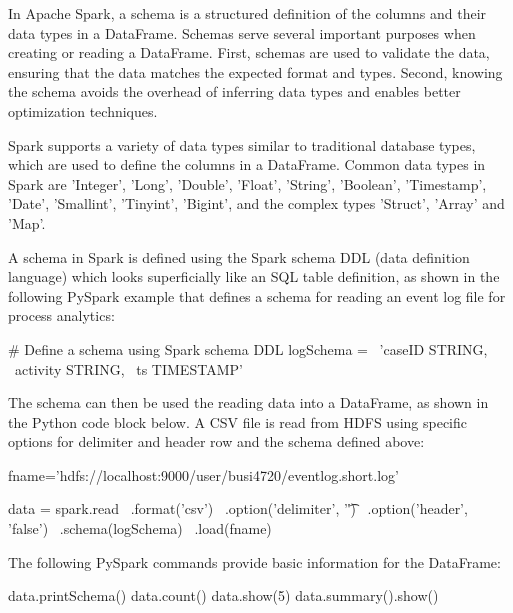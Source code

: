 In Apache Spark, a schema is a structured definition of the columns and their data types in a DataFrame. Schemas serve several important purposes when creating or reading a DataFrame. First, schemas are used to validate the data, ensuring that the data matches the expected format and types. Second, knowing the schema avoids the overhead of inferring data types and enables better optimization techniques. 

Spark supports a variety of data types similar to traditional database types, which are used to define the columns in a DataFrame. Common data types in Spark are 'Integer', 'Long', 'Double', 'Float', 'String', 'Boolean', 'Timestamp', 'Date', 'Smallint', 'Tinyint', 'Bigint', and the complex types 'Struct', 'Array' and 'Map'.

A schema in Spark is defined using the Spark schema DDL (data definition language) which looks superficially like an SQL table definition, as shown in the following PySpark example that defines a schema for reading an event log file for process analytics:

\begin{samepage}
\begin{pythoncode}
# Define a schema using Spark schema DDL
logSchema = \
    'caseID STRING, \
     activity STRING, \
     ts TIMESTAMP'
\end{pythoncode}
\end{samepage}

The schema can then be used the reading data into a DataFrame, as shown in the Python code block below. A CSV file is read from HDFS using specific options for delimiter and header row and the schema defined above:

\begin{samepage}
\begin{pythoncode}
fname='hdfs://localhost:9000/user/busi4720/eventlog.short.log'

data = spark.read \
    .format('csv') \
    .option('delimiter', '\t') \
    .option('header', 'false') \
    .schema(logSchema) \
    .load(fname)
\end{pythoncode}
\end{samepage}

The following PySpark commands provide basic information for the DataFrame:

\begin{samepage}
\begin{pythoncode}
data.printSchema()
data.count()
data.show(5)
data.summary().show()
\end{pythoncode}
\end{samepage}

